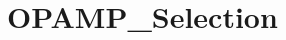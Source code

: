\hypertarget{group___o_p_a_m_p___selection}{\section{O\-P\-A\-M\-P\-\_\-\-Selection}
\label{group___o_p_a_m_p___selection}
}

